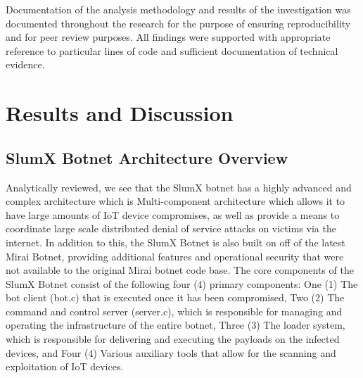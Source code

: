 \documentclass[12pt,letterpaper]{report}
\begin{document}
Documentation of the analysis methodology and results of the investigation was documented throughout the research for the purpose of ensuring reproducibility and for peer review purposes. All findings were supported with appropriate reference to particular lines of code and sufficient documentation of technical evidence.

\chapter{Results and Discussion}

\section{SlumX Botnet Architecture Overview}

Analytically reviewed, we see that the SlumX botnet has a highly advanced and complex architecture which is Multi-component architecture which allows it to have large amounts of IoT device compromises, as well as provide a means to coordinate large scale distributed denial of service attacks on victims via the internet. In addition to this, the SlumX Botnet is also built on off of the latest Mirai Botnet, providing additional features and operational security that were not available to the original Mirai botnet code base.
The core components of the SlumX Botnet consist of the following four (4) primary components: One (1) The bot client (bot.c) that is executed once it has been compromised, Two (2) The command and control server (server.c), which is responsible for managing and operating the infrastructure of the entire botnet, Three (3) The loader system, which is responsible for delivering and executing the payloads on the infected devices, and Four (4) Various auxiliary tools that allow for the scanning and exploitation of IoT devices.
\end{document}
